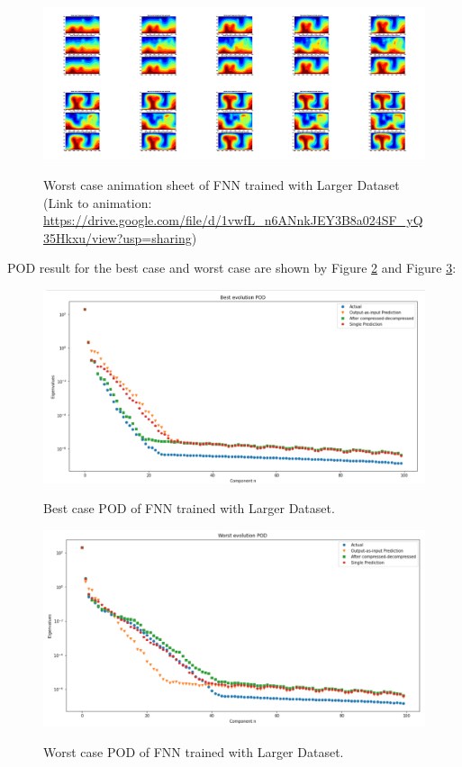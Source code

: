 \begin{figure}[H]
    \centering
    \caption{Worst case animation sheet of FNN trained with Larger Dataset (Link to animation: 
    \url{https://drive.google.com/file/d/1vwfL_n6ANnkJEY3B8a024SF_yQ35Hkxu/view?usp=sharing})}
    \includegraphics[scale=0.10]{figures/mantle_convection_images/larger_dataset/FNN_Worst_GIF_sheet.png}
    \label{figure:FNN_larger_worst_gif}
\end{figure}

POD result for the best case and worst case are shown by Figure \ref{figure:FNN_larger_best_POD} and Figure \ref{figure:FNN_larger_worst_POD}:

\begin{figure}[H]
    \caption{Best case POD of FNN trained with Larger Dataset.}
    \includegraphics[scale=0.5]{figures/mantle_convection_images/larger_dataset/FNN_Best_POD.png}
    \label{figure:FNN_larger_best_POD}
\end{figure}

\begin{figure}[H]
    \caption{Worst case POD of FNN trained with Larger Dataset.}
    \includegraphics[scale=0.5]{figures/mantle_convection_images/larger_dataset/FNN_Worst_POD.png}
    \label{figure:FNN_larger_worst_POD}
\end{figure}

